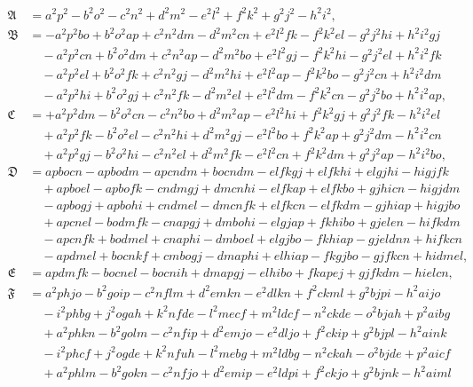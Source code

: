 \documentclass[11pt,a4paper]{book}
\begin{document}
\begin{align*}
\mathfrak{A} &= a^2p^2 - b^2o^2 - c^2n^2 + d^2m^2 - e^2l^2 + f^2k^2 + g^2j^2 - h^2i^2, \\
\mathfrak{B} &= -a^2p^2bo + b^2o^2ap + c^2n^2dm - d^2m^2cn + e^2l^2fk - f^2k^2el - g^2j^2hi + h^2i^2gj \\
&\quad -a^2p^2cn + b^2o^2dm + c^2n^2ap - d^2m^2bo + e^2l^2gj - f^2k^2hi - g^2j^2el + h^2i^2fk \\
&\quad -a^2p^2el + b^2o^2fk + c^2n^2gj - d^2m^2hi + e^2l^2ap - f^2k^2bo - g^2j^2cn + h^2i^2dm \\
&\quad -a^2p^2hi + b^2o^2gj + c^2n^2fk - d^2m^2el + e^2l^2dm - f^2k^2cn - g^2j^2bo + h^2i^2ap, \\
\mathfrak{C} &= +a^2p^2dm - b^2o^2cn - c^2n^2bo + d^2m^2ap - e^2l^2hi + f^2k^2gj + g^2j^2fk - h^2i^2el \\
&\quad +a^2p^2fk - b^2o^2el - c^2n^2hi + d^2m^2gj - e^2l^2bo + f^2k^2ap + g^2j^2dm - h^2i^2cn \\
&\quad +a^2p^2gj - b^2o^2hi - c^2n^2el + d^2m^2fk - e^2l^2cn + f^2k^2dm + g^2j^2ap - h^2i^2bo, \\
\mathfrak{D} &= apbocn - apbodm - apcndm + bocndm - elfkgj + elfkhi + elgjhi - higjfk \\
&\quad + apboel - apbofk - cndmgj + dmcnhi - elfkap + elfkbo + gjhicn - higjdm \\
&\quad - apbogj + apbohi + cndmel - dmcnfk + elfkcn - elfkdm - gjhiap + higjbo \\
&\quad + apcnel - bodmfk - cnapgj + dmbohi - elgjap + fkhibo + gjelen - hifkdm \\
&\quad - apcnfk + bodmel + cnaphi - dmboel + elgjbo - fkhiap - gjeldnn + hifkcn \\
&\quad - apdmel + bocnkf + cmbogj - dmaphi + elhiap - fkgjbo - gjfkcn + hidmel, \\
\mathfrak{E} &= apdmfk - bocnel - bocnih + dmapgj - elhibo + fkapej + gjfkdm - hielcn, \\
\mathfrak{F} &= a^2phjo - b^2goip - c^2nflm + d^2emkn - e^2dlkn + f^2ckml + g^2bjpi - h^2aijo \\
&\quad -i^2phbg + j^2ogah + k^2nfde - l^2mecf + m^2ldcf - n^2ckde - o^2bjah + p^2aibg \\
&\quad +a^2phkn - b^2golm - c^2nfip + d^2emjo - e^2dljo + f^2ckip + g^2bjpl - h^2aink \\
&\quad -i^2phcf + j^2ogde + k^2nfuh - l^2mebg + m^2ldbg - n^2ckah - o^2bjde + p^2aicf \\
&\quad +a^2phlm - b^2gokn - c^2nfjo + d^2emip - e^2ldpi + f^2ckjo + g^2bjnk - h^2aiml \\

\end{align*}
\end{document}
